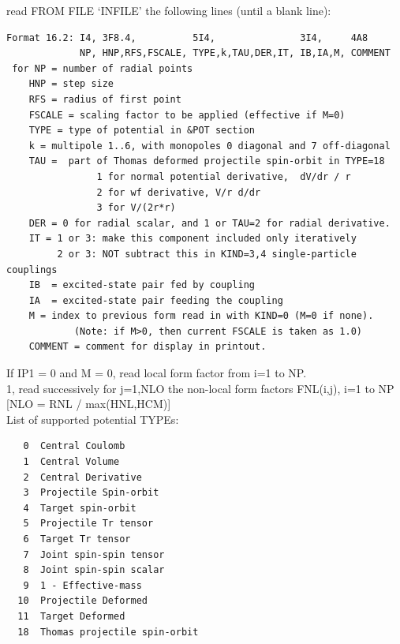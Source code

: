 \documentclass[11pt]{article}
\begin{document}
\begin{description}
read FROM FILE `INFILE'  the following lines
   (until a blank line):
\begin{verbatim}
Format 16.2: I4, 3F8.4,          5I4,               3I4,     4A8
             NP, HNP,RFS,FSCALE, TYPE,k,TAU,DER,IT, IB,IA,M, COMMENT
 for NP = number of radial points
    HNP = step size
    RFS = radius of first point
    FSCALE = scaling factor to be applied (effective if M=0)
    TYPE = type of potential in &POT section
    k = multipole 1..6, with monopoles 0 diagonal and 7 off-diagonal
    TAU =  part of Thomas deformed projectile spin-orbit in TYPE=18
                1 for normal potential derivative,  dV/dr / r
                2 for wf derivative, V/r d/dr
                3 for V/(2r*r) 
    DER = 0 for radial scalar, and 1 or TAU=2 for radial derivative.
    IT = 1 or 3: make this component included only iteratively
         2 or 3: NOT subtract this in KIND=3,4 single-particle couplings
    IB  = excited-state pair fed by coupling 
    IA  = excited-state pair feeding the coupling
    M = index to previous form read in with KIND=0 (M=0 if none).
            (Note: if M>0, then current FSCALE is taken as 1.0)
    COMMENT = comment for display in printout.
\end{verbatim}
 
 If IP1 = 0 and M = 0, read local form factor from i=1 to NP.
\\  1, read successively for j=1,NLO the non-local form factors  FNL(i,j), i=1 to NP   [NLO = RNL / max(HNL,HCM)]
\\

List of supported potential TYPEs:
\begin{verbatim}
   0  Central Coulomb
   1  Central Volume
   2  Central Derivative
   3  Projectile Spin-orbit
   4  Target spin-orbit
   5  Projectile Tr tensor
   6  Target Tr tensor
   7  Joint spin-spin tensor
   8  Joint spin-spin scalar
   9  1 - Effective-mass
  10  Projectile Deformed
  11  Target Deformed
  18  Thomas projectile spin-orbit 
 \end{verbatim}


\end{description}
\end{document}
